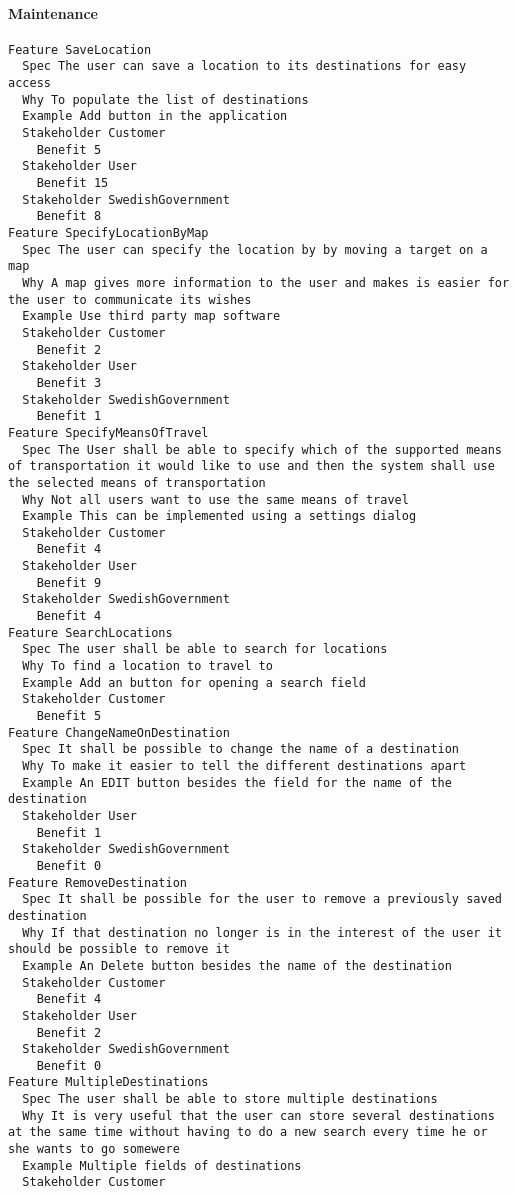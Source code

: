         
       \paragraph{Maintenance}


\begin{lstlisting}
Feature SaveLocation
  Spec The user can save a location to its destinations for easy access
  Why To populate the list of destinations
  Example Add button in the application
  Stakeholder Customer
    Benefit 5
  Stakeholder User
    Benefit 15
  Stakeholder SwedishGovernment
    Benefit 8
Feature SpecifyLocationByMap
  Spec The user can specify the location by by moving a target on a map
  Why A map gives more information to the user and makes is easier for the user to communicate its wishes
  Example Use third party map software
  Stakeholder Customer
    Benefit 2
  Stakeholder User
    Benefit 3
  Stakeholder SwedishGovernment
    Benefit 1
Feature SpecifyMeansOfTravel
  Spec The User shall be able to specify which of the supported means of transportation it would like to use and then the system shall use the selected means of transportation
  Why Not all users want to use the same means of travel
  Example This can be implemented using a settings dialog
  Stakeholder Customer
    Benefit 4
  Stakeholder User
    Benefit 9
  Stakeholder SwedishGovernment
    Benefit 4
Feature SearchLocations
  Spec The user shall be able to search for locations
  Why To find a location to travel to
  Example Add an button for opening a search field
  Stakeholder Customer
    Benefit 5
Feature ChangeNameOnDestination
  Spec It shall be possible to change the name of a destination
  Why To make it easier to tell the different destinations apart
  Example An EDIT button besides the field for the name of the destination
  Stakeholder User
    Benefit 1
  Stakeholder SwedishGovernment
    Benefit 0
Feature RemoveDestination
  Spec It shall be possible for the user to remove a previously saved destination
  Why If that destination no longer is in the interest of the user it should be possible to remove it
  Example An Delete button besides the name of the destination
  Stakeholder Customer
    Benefit 4
  Stakeholder User
    Benefit 2
  Stakeholder SwedishGovernment
    Benefit 0
Feature MultipleDestinations
  Spec The user shall be able to store multiple destinations
  Why It is very useful that the user can store several destinations at the same time without having to do a new search every time he or she wants to go somewere
  Example Multiple fields of destinations
  Stakeholder Customer

\end{lstlisting}
